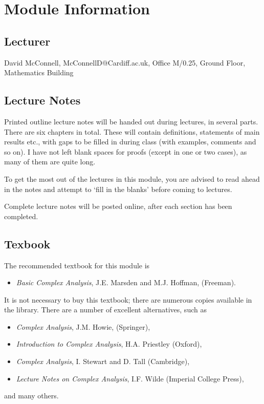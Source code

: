 
\section*{Module Information}

\subsection*{Lecturer}
David McConnell, McConnellD@Cardiff.ac.uk, Office M/0.25, Ground Floor, Mathematics Building

\subsection*{Lecture Notes}
Printed outline lecture notes will be handed out during lectures, in several parts.  There are six chapters in total.  These will contain definitions, statements of main results etc., with gaps to be filled in during class (with examples, comments and so on).  I have not left blank spaces for proofs (except in one or two cases), as many of them are quite long.

To get the most out of the lectures in this module, you are advised to read ahead in the notes and attempt to `fill in the blanks' before coming to lectures.

Complete lecture notes will be posted online, after each section has been completed.

\subsection*{Texbook}

The recommended textbook for this module is
\begin{itemize}
\item \emph{Basic Complex Analysis}, J.E. Marsden and M.J. Hoffman, (Freeman).
\end{itemize}
It is not necessary to buy this textbook; there are numerous copies available in the library.  There are a number of excellent alternatives, such as
\begin{itemize}
\item \emph{Complex Analysis}, J.M. Howie, (Springer),
\item \emph{Introduction to Complex Analysis}, H.A. Priestley (Oxford),
\item \emph{Complex Analysis}, I. Stewart and D. Tall (Cambridge),
\item \emph{Lecture Notes on Complex Analysis}, I.F. Wilde (Imperial College Press),
\end{itemize}
and many others.


